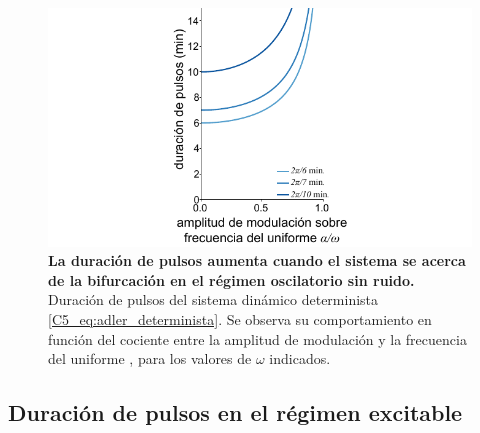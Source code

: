 \documentclass[./main.tex]{subfiles}
\begin{document}
 \begin{figure}
    \centering
    \includegraphics[width=1\columnwidth]{figures/chapter5/C5_T_osc.pdf} 
    \caption{\textbf{La duración de pulsos aumenta cuando el sistema se acerca de la bifurcación en el régimen oscilatorio sin ruido.} Duración de pulsos del sistema dinámico determinista \ref{C5_eq:adler_determinista}. Se observa su comportamiento en función del cociente entre la amplitud de modulación y la frecuencia del uniforme \dddelta, para los valores de $\omega$ indicados.}
    \label{C5_fig:T_osc}
\end{figure}


\subsection{Duración de pulsos en el régimen excitable}
\label{C5_sec:T_exc}
\end{document}

